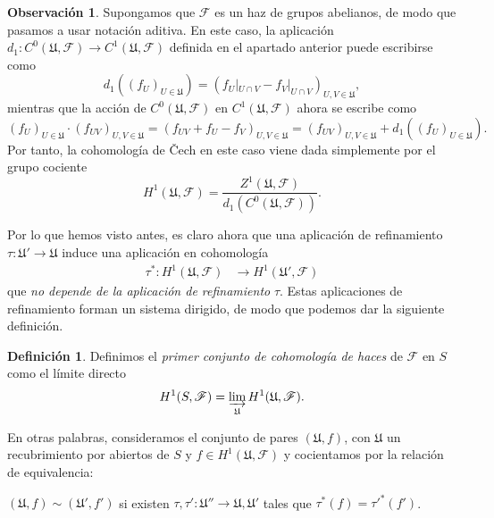 \documentclass[12pt,a4paper]{article}
\theoremstyle{definition} \newtheorem{defn}[thm]{Definición}
\theoremstyle{definition} \newtheorem{ejemplo}[thm]{Ejemplo}
\theoremstyle{definition} \newtheorem{ejercicio}[thm]{Ejercicio}
\newtheorem{obs}[thm]{Observación}
\def\FF{\mathscr{F}}
\def\UU{\mathfrak{U}}
\begin{document}
	  \begin{obs}
	    Supongamos que $\FF$ es un haz de grupos abelianos, de modo que pasamos a usar notación aditiva. En este caso, la aplicación $d_1:C^0(\UU,\FF) \rightarrow C^1(\UU,\FF)$ definida en el apartado anterior puede escribirse como 
	    \begin{equation*}
	      d_1 ( (f_U)_{U\in \UU} ) = ( f_U|_{U\cap V} - f_V|_{U\cap V} )_{U,V \in \UU},
	    \end{equation*}
	    mientras que la acción de $C^0(\UU,\FF)$ en $C^1(\UU,\FF)$ ahora se escribe como
	    \begin{equation*}
	      (f_U)_{U\in \UU} \cdot (f_{UV})_{U,V \in \UU} = (f_{UV} + f_U - f_V)_{U,V \in \UU} = (f_{UV})_{U,V \in \UU} + d_1((f_U)_{U\in \UU}).
	    \end{equation*}
	    Por tanto, la cohomología de \v{C}ech en este caso viene dada simplemente por el grupo cociente
	    \begin{equation*}
	      H^1(\UU,\FF) = \frac{Z^1(\UU,\FF)}{d_1(C^0(\UU,\FF))}.
	    \end{equation*}
	  \end{obs}
	
	  Por lo que hemos visto antes, es claro ahora que una aplicación de refinamiento $\tau:\UU'\rightarrow \UU$ induce una aplicación en cohomología
	  \begin{align*}
	    \tau^* :H^1(\UU,\FF)&\longrightarrow H^1(\UU',\FF)
	    \end{align*}
	    que \emph{no depende de la aplicación de refinamiento} $\tau$. Estas aplicaciones de refinamiento forman un sistema dirigido, de modo que podemos dar la siguiente definición.

	    \begin{defn}
	      Definimos el \emph{primer conjunto de cohomología de haces} de $\FF$ en $S$ como el límite directo 
	      \begin{equation*}
		H^1(S,\FF) = \varinjlim_{\UU} H^1(\UU,\FF).
	      \end{equation*}
	    \end{defn}

	    En otras palabras, consideramos el conjunto de pares $(\UU,f)$, con $\UU$ un recubrimiento por abiertos de $S$ y $f\in H^1(\UU,\FF)$ y cocientamos por la relación de equivalencia:
	    \begin{center}
	      $(\UU,f) \sim (\UU',f')$ si existen $\tau,\tau':\UU'' \rightarrow \UU, \UU'$ tales que $\tau^*(f) = \tau'^*(f')$.
	    \end{center}
\end{document}
